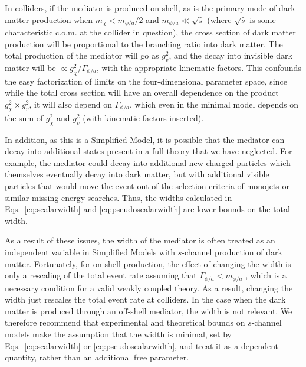 In colliders, if the mediator is produced on-shell, as is the primary mode of dark matter production when $m_\chi < m_{\phi/a} /2$ and $m_{\phi/a} \ll \sqrt{\hat{s}}$ (where $\sqrt{\hat{s}}$ is some characteristic c.o.m. at the collider in question), the cross section of dark matter production will be proportional to the branching ratio into dark matter. The total production of the mediator will go as $g_v^2$, and the decay into invisible dark matter will be $\propto g_\chi^2/\Gamma_{\phi/a}$, with the appropriate kinematic factors. This confounds the easy factorization of limits on the four-dimensional parameter space, since while the total cross section will have an overall dependence on the product $g_\chi^2 \times g_v^2$, it will also depend on $\Gamma_{\phi/a}$, which even in the minimal model depends on the sum of $g_\chi^2$ and $g_v^2$ (with kinematic factors inserted). 

In addition, as this is a Simplified Model, it is possible that the mediator can decay into additional states present in a full theory that we have neglected. For example, the mediator could decay into additional new charged particles which themselves eventually decay into dark matter, but with additional visible particles that would move the event out of the selection criteria of monojets or similar missing energy searches. Thus, the widths calculated in Eqs.~\eqref{eq:scalarwidth} and \eqref{eq:pseudoscalarwidth} are lower bounds on the total width. 

As a result of these issues, the width of the mediator is often treated as an independent variable in Simplified Models with $s$-channel production of dark matter. Fortunately, for on-shell production, the effect of changing the width is only a rescaling of the total event rate assuming that $\Gamma_{\phi/a} < m_{\phi/a}$ \cite{1410.6497}, which is a necessary condition for a valid weakly coupled theory. As a result, changing the width just rescales the total event rate at colliders. In the case when the dark matter is produced through an off-shell mediator, the width is not relevant. We therefore recommend that experimental and theoretical bounds on $s$-channel models make the assumption that the width is minimal, set by Eqs.~\eqref{eq:scalarwidth} or \eqref{eq:pseudoscalarwidth}, and treat it as a dependent quantity, rather than an additional free parameter.

